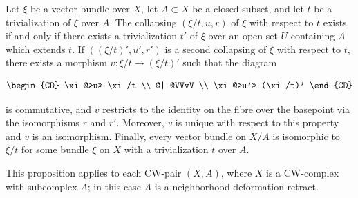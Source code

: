 Let $\xi$ be a vector bundle over $X$, let $A \subset X$ be a closed subset, and let $t$ be a trivialization of $\xi$ over $A$. The collapsing $(\xi/t, u, r)$ of $\xi$ with respect to $t$ exists if and only if there exists a trivialization $t'$ of $\xi$ over an open set $U$ containing $A$ which extends $t$. If $((\xi/t)', u', r')$ is a second collapsing of $\xi$ with respect to $t$, there exists a morphism $v: \xi/t \rightarrow (\xi/t)'$ such that the diagram

\[
\begin{CD}
\xi @>u>> \xi/t \\
@| @VVvV \\
\xi @>u'>> (\xi/t)'
\end{CD}
\]

is commutative, and $v$ restricts to the identity on the fibre over the basepoint via the isomorphisms $r$ and $r'$. Moreover, $v$ is unique with respect to this property and $v$ is an isomorphism. Finally, every vector bundle on $X/A$ is isomorphic to $\xi/t$ for some bundle $\xi$ on $X$ with a trivialization $t$ over $A$.

This proposition applies to each CW-pair $(X, A)$, where $X$ is a CW-complex with subcomplex $A$; in this case $A$ is a neighborhood deformation retract.
